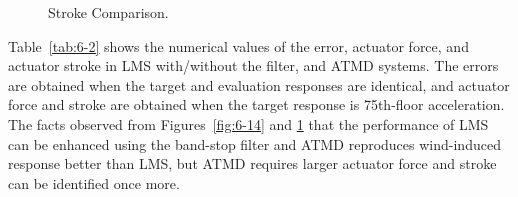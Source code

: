 \begin{figure}[!ht]
\centering
{}
\caption{Stroke Comparison.}
\label{fig:6-15}
\end{figure}

Table~\ref{tab:6-2} shows the numerical values of the error, actuator force, and actuator stroke in LMS with/without the filter, and ATMD systems. The errors are obtained when the target and evaluation responses are identical, and actuator force and stroke are obtained when the target response is 75th-floor acceleration. The facts observed from Figures~\ref{fig:6-14} and \ref{fig:6-15} that the performance of LMS can be enhanced using the band-stop filter and ATMD reproduces wind-induced response better than LMS, but ATMD requires larger actuator force and stroke can be identified once more.

